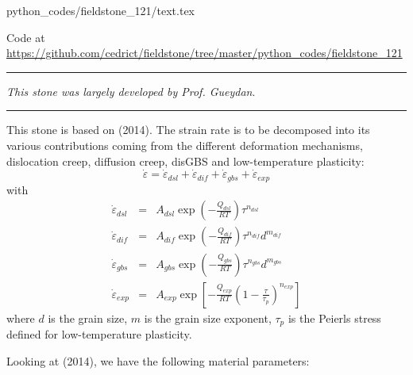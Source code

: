 \begin{flushright} {\tiny {\color{gray} python\_codes/fieldstone\_121/text.tex}} \end{flushright}

\begin{center}

Code at \url{https://github.com/cedrict/fieldstone/tree/master/python_codes/fieldstone_121}
\end{center}

\par\noindent\rule{\textwidth}{0.4pt}

{\sl This stone was largely developed by Prof. Gueydan}. 

\par\noindent\rule{\textwidth}{0.4pt}

This stone is based on \textcite{gupr14} (2014). 
The strain rate is to be decomposed into its various contributions 
coming from the different deformation mechanisms, dislocation creep,
diffusion creep, disGBS and low-temperature plasticity:
\[
\dot\varepsilon = \dot\varepsilon_{dsl} + \dot\varepsilon_{dif} + 
\dot\varepsilon_{gbs} + \dot\varepsilon_{exp} 
\]
with
\begin{eqnarray}
\dot{\varepsilon}_{dsl}&=&A_{dsl}\exp\left(-\frac{Q_{dsl}}{RT} \right) \tau^{n_{dsl}}  \\
\dot{\varepsilon}_{dif}&=&A_{dif}\exp\left(-\frac{Q_{dif}}{RT} \right) \tau^{n_{dif}} d^{m_{dif}} \\
\dot{\varepsilon}_{gbs}&=&A_{gbs}\exp\left(-\frac{Q_{gbs}}{RT} \right) \tau^{n_{gbs}} d^{m_{gbs}} \\
\dot{\varepsilon}_{exp}&=&A_{exp}\exp\left[-\frac{Q_{exp}}{RT} \left(1 -\frac{\tau}{\tau_p}\right)^{n_{exp}} \right]   
\end{eqnarray}
where $d$ is the grain size, $m$ is the grain size exponent, $\tau_p$ is the Peierls stress defined
for low-temperature plasticity.

Looking at \textcite{gupr14} (2014), we have the following material parameters:


